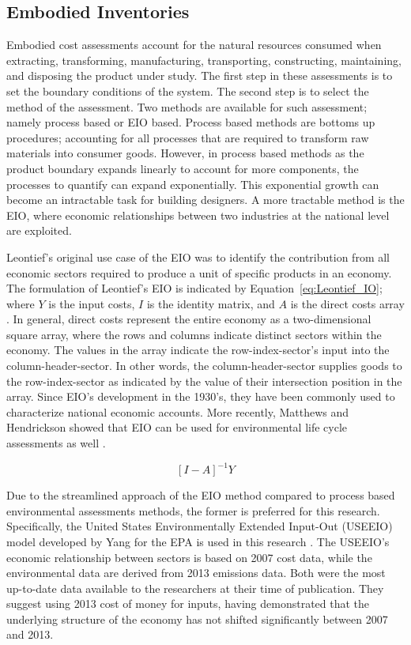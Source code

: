     \subsection{Embodied Inventories}
    \label{sec: embodied}
    Embodied cost assessments account for the natural resources consumed when extracting, transforming, manufacturing, transporting, constructing, maintaining, and disposing the product under study. The first step in these assessments is to set the boundary conditions of the system. The second step is to select the method of the assessment. Two methods are available for such assessment; namely process based or EIO based. Process based methods are bottoms up procedures; accounting for all processes that are required to transform raw materials into consumer goods. However, in process based methods as the product boundary expands linearly to account for more components, the processes to quantify can expand exponentially. This exponential growth can become an intractable task for building designers. A more tractable method is the EIO, where economic relationships between two industries at the national level are exploited. 
    
    Leontief's original use case of the EIO was to identify the contribution from all economic sectors required to produce a unit of specific products in an economy.  The formulation of Leontief's EIO is indicated by Equation~\ref{eq:Leontief_IO}; where $Y$ is the input costs, $I$ is the identity matrix, and $A$ is the direct costs array \cite{matthews15}. In general, direct costs represent the entire economy as a two-dimensional square array, where the rows and columns indicate distinct sectors within the economy. The values in the array indicate the row-index-sector’s input into the column-header-sector. In other words, the column-header-sector supplies goods to the row-index-sector as indicated by the value of their intersection position in the array. Since EIO's development in the 1930's, they have been commonly used to characterize national economic accounts. More recently, Matthews and Hendrickson showed that EIO can be used for environmental life cycle assessments as well \cite{matthews15}.  
    
        \begin{equation} \label{eq:Leontief_IO}
            [I-A]^{-1}Y
        \end{equation}
   
    Due to the streamlined approach of the EIO method compared to process based environmental assessments methods, the former is preferred for this research. Specifically, the United States Environmentally Extended Input-Out (USEEIO) model developed by Yang for the EPA is used in this research \cite{yang17}. The USEEIO’s economic relationship between sectors is based on 2007 cost data, while the environmental data are derived from 2013 emissions data. Both were the most up-to-date data available to the researchers at their time of publication. They suggest using 2013 cost of money for inputs, having demonstrated that the underlying structure of the economy has not shifted significantly between 2007 and 2013. 
    
